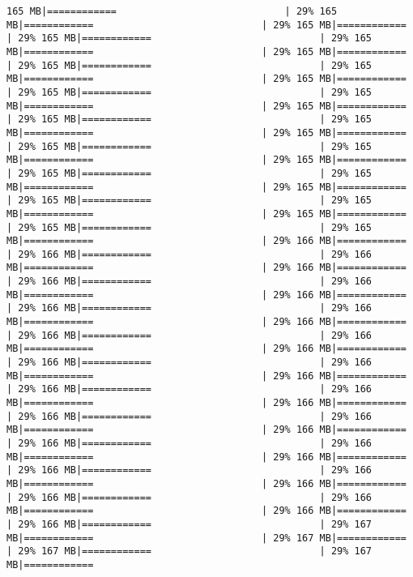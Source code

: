 \documentclass[
]{article}
\begin{document}
\begin{verbatim}
165 MB|============                             | 29% 165 MB|============                             | 29% 165 MB|============                             | 29% 165 MB|============                             | 29% 165 MB|============                             | 29% 165 MB|============                             | 29% 165 MB|============                             | 29% 165 MB|============                             | 29% 165 MB|============                             | 29% 165 MB|============                             | 29% 165 MB|============                             | 29% 165 MB|============                             | 29% 165 MB|============                             | 29% 165 MB|============                             | 29% 165 MB|============                             | 29% 165 MB|============                             | 29% 165 MB|============                             | 29% 165 MB|============                             | 29% 165 MB|============                             | 29% 165 MB|============                             | 29% 165 MB|============                             | 29% 165 MB|============                             | 29% 165 MB|============                             | 29% 165 MB|============                             | 29% 165 MB|============                             | 29% 165 MB|============                             | 29% 166 MB|============                             | 29% 166 MB|============                             | 29% 166 MB|============                             | 29% 166 MB|============                             | 29% 166 MB|============                             | 29% 166 MB|============                             | 29% 166 MB|============                             | 29% 166 MB|============                             | 29% 166 MB|============                             | 29% 166 MB|============                             | 29% 166 MB|============                             | 29% 166 MB|============                             | 29% 166 MB|============                             | 29% 166 MB|============                             | 29% 166 MB|============                             | 29% 166 MB|============                             | 29% 166 MB|============                             | 29% 166 MB|============                             | 29% 166 MB|============                             | 29% 166 MB|============                             | 29% 166 MB|============                             | 29% 166 MB|============                             | 29% 166 MB|============                             | 29% 166 MB|============                             | 29% 166 MB|============                             | 29% 166 MB|============                             | 29% 166 MB|============                             | 29% 166 MB|============                             | 29% 166 MB|============                             | 29% 166 MB|============                             | 29% 166 MB|============                             | 29% 166 MB|============                             | 29% 167 MB|============                             | 29% 167 MB|============                             | 29% 167 MB|============                             | 29% 167 MB|============      
\end{verbatim}
\end{document}

